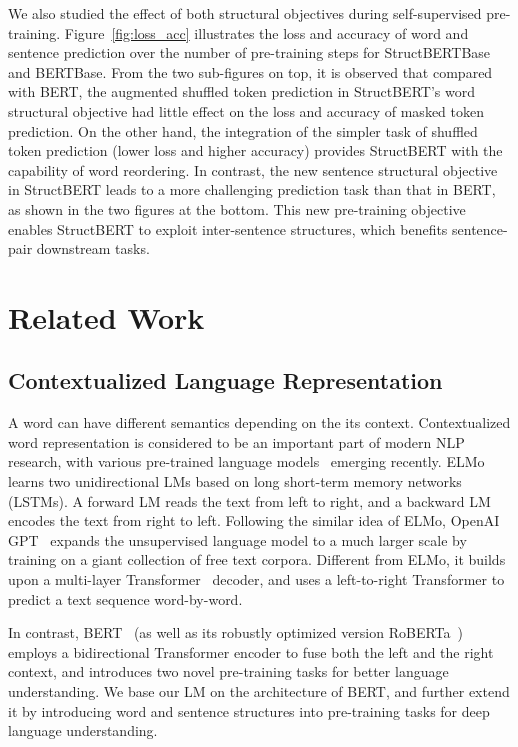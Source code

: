 \documentclass{article}
\begin{document}
We also studied the effect of both structural objectives during self-supervised pre-training. Figure~\ref{fig:loss_acc} illustrates the loss and accuracy of word and sentence prediction over the number of pre-training steps for StructBERT{\small Base} and BERT{\small Base}. From the two sub-figures on top, it is observed that compared with BERT, the augmented shuffled token prediction in StructBERT's word structural objective had little effect on the loss and accuracy of masked token prediction. On the other hand, the integration of the simpler task of shuffled token prediction (lower loss and higher accuracy) provides StructBERT with the capability of word reordering. In contrast, the new sentence structural objective in StructBERT leads to a more challenging prediction task than that in BERT, as shown in the two figures at the bottom. This new pre-training objective enables StructBERT to exploit inter-sentence structures, which benefits sentence-pair downstream tasks.

\section{Related Work}
\subsection{Contextualized Language Representation}
A word can have different semantics depending on the its context. Contextualized word representation is considered to be an important part of modern NLP research, with various pre-trained language models~\cite{mccann2017learned,peters2018deep,radford2018improving,devlin2018bert} emerging recently. ELMo~\cite{peters2018deep} learns two unidirectional LMs based on long short-term memory networks (LSTMs). A forward LM reads the text from left to right, and a backward LM encodes the text from right to left. Following the similar idea of ELMo, OpenAI GPT~\cite{radford2018improving} expands the unsupervised language model to a much larger scale by training on a giant collection of free text corpora. Different from ELMo, it builds upon a multi-layer Transformer~\cite{vaswani2017attention} decoder, and uses a left-to-right Transformer to predict a text sequence word-by-word.



In contrast, BERT~\cite{devlin2018bert} (as well as its robustly optimized version RoBERTa~\cite{liu2019roberta}) employs a bidirectional Transformer encoder to fuse both the left and the right context, and introduces two novel pre-training tasks for better language understanding. We base our LM on the architecture of BERT, and further extend it by introducing word and sentence structures into pre-training tasks for deep language understanding.
\end{document}
